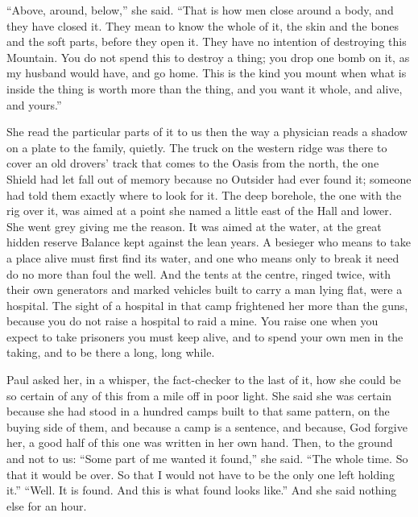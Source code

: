 ``Above, around, below,'' she said. ``That is how men close around a body, and they have closed it. They mean to know the whole of it, the skin and the bones and the soft parts, before they open it. They have no intention of destroying this Mountain. You do not spend this to destroy a thing; you drop one bomb on it, as my husband would have, and go home. This is the kind you mount when what is inside the thing is worth more than the thing, and you want it whole, and alive, and yours.''\par

She read the particular parts of it to us then the way a physician reads a shadow on a plate to the family, quietly. The truck on the western ridge was there to cover an old drovers' track that comes to the Oasis from the north, the one Shield had let fall out of memory because no Outsider had ever found it; someone had told them exactly where to look for it. The deep borehole, the one with the rig over it, was aimed at a point she named a little east of the Hall and lower. She went grey giving me the reason. It was aimed at the water, at the great hidden reserve Balance kept against the lean years. A besieger who means to take a place alive must first find its water, and one who means only to break it need do no more than foul the well. And the tents at the centre, ringed twice, with their own generators and marked vehicles built to carry a man lying flat, were a hospital. The sight of a hospital in that camp frightened her more than the guns, because you do not raise a hospital to raid a mine. You raise one when you expect to take prisoners you must keep alive, and to spend your own men in the taking, and to be there a long, long while.\par

Paul asked her, in a whisper, the fact-checker to the last of it, how she could be so certain of any of this from a mile off in poor light. She said she was certain because she had stood in a hundred camps built to that same pattern, on the buying side of them, and because a camp is a sentence, and because, God forgive her, a good half of this one was written in her own hand. Then, to the ground and not to us: ``Some part of me wanted it found,'' she said. ``The whole time. So that it would be over. So that I would not have to be the only one left holding it.'' ``Well. It is found. And this is what found looks like.'' And she said nothing else for an hour.\par

